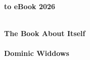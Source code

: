 
\thispagestyle{empty}

\vspace{3cm}
  \begin{center}
	\bfseries \Huge \latex to eBook 2026 \par   %
        ~\\
	\bfseries \LARGE The Book About Itself \\   %
        ~\\
        \bfseries \Large Dominic Widdows \par   %
    \end{center}
    
\par

\newpage
